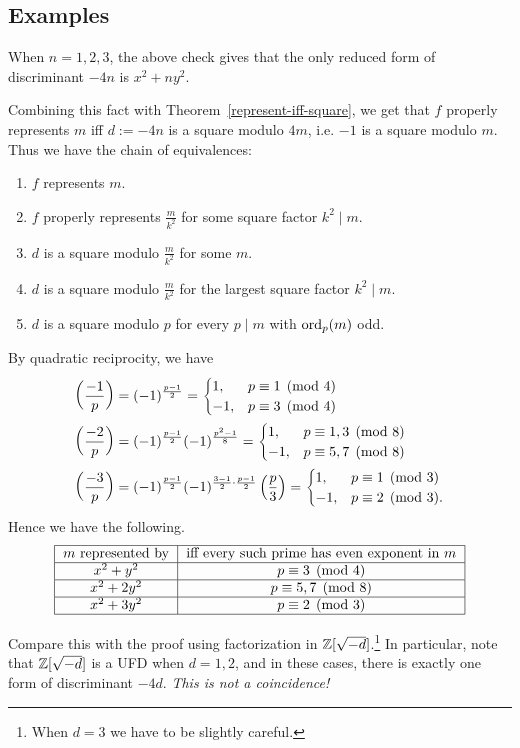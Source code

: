\subsection{Examples}
\begin{ex}
When $n=1,2,3$, the above check gives that the only reduced form of discriminant $-4n$ is $x^2+ny^2$.

Combining this fact with Theorem~\ref{represent-iff-square}, we get that $f$ properly represents $m$ iff $d:=-4n$ is a square modulo $4m$, i.e. $-1$ is a square modulo $m$. Thus we have the chain of equivalences:
\begin{enumerate}
\item $f$ represents $m$.
\item $f$ properly represents $\frac{m}{k^2}$ for some square factor $k^2\mid m$.
\item $d$ is a square modulo $\frac{m}{k^2}$ for some $m$.
\item $d$ is a square modulo $\frac{m}{k^2}$ for the largest square factor $k^2\mid m$.
\item $d$ is a square modulo $p$ for every $p\mid m$ with $\operatorname{ord}_p(m)$ odd.
\end{enumerate}
By quadratic reciprocity, we have
\begin{align*}
\left( {\frac{-1}{p}} \right)&=(-1)^{\frac{p-1}2}=\begin{cases}
1,&p\equiv 1\pmod 4\\
-1,&p\equiv 3\pmod 4
\end{cases}\\
\left( {\frac{-2}{p}} \right)&=(-1)^{\frac{p-1}2}(-1)^{\frac{p^2-1}8}=\begin{cases}
1,&p\equiv 1,3\pmod 8\\
-1,&p\equiv 5,7\pmod 8
\end{cases}\\
\left( {\frac{-3}{p}} \right)&=(-1)^{\frac{p-1}2}(-1)^{\frac{3-1}2\cdot \frac{p-1}2}\left( {\frac{p}{3}} \right)=\begin{cases}
1,&p\equiv 1\pmod 3\\
-1,&p\equiv 2\pmod 3.
\end{cases}
\end{align*}
Hence we have the following.
\[
\begin{tabular}{|c|c|}
\hline
$m$\text{ represented by}&\text{iff every such prime has even exponent in }$m$\\
\hline
$x^2+y^2$& $p\equiv 3\pmod 4$\\
\hline
$x^2+2y^2$& $p\equiv 5,7\pmod 8$\\
\hline
$x^2+3y^2$& $p\equiv 2\pmod 3$\\
\hline
\end{tabular}
\]
\end{ex}
Compare this with the proof using factorization in $\mathbb{Z}[\sqrt{-d}]$.\footnote{When $d=3$ we have to be slightly careful.} In particular, note that $\mathbb{Z}[\sqrt{-d}]$ is a UFD when $d=1,2$, and in these cases, there is exactly one form of discriminant $-4d$. {\it This is not a coincidence!}

